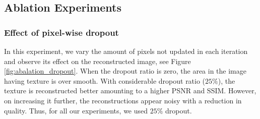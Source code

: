 \documentclass[journal,twoside]{IEEEtran}
\begin{document}
\subsection{Ablation Experiments}

\subsubsection{Effect of pixel-wise dropout}
\label{sec:abalation}
In this experiment, we vary the amount of pixels not updated in each iteration and observe its effect on the reconstructed image, see Figure \ref{fig:abalation_dropout}. When the dropout ratio is zero, the area in the image having texture is over smooth. With considerable dropout ratio ($25\%$), the texture is reconstructed better amounting to a higher PSNR and SSIM. However, on increasing it further, the reconstructions appear noisy with a reduction in quality. Thus, for all our experiments, we used $25\%$ dropout.   
\end{document}

